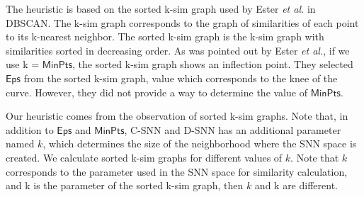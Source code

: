 \documentclass[smallextended]{svjour3}       %
\begin{document}
The heuristic is based on the sorted k-sim graph used by Ester \textit{et al.} \cite{E96} in DBSCAN. The k-sim graph corresponds to the graph of similarities of each point to its k-nearest neighbor. The sorted k-sim graph is the k-sim graph with similarities sorted in decreasing order. As was pointed out by Ester \textit{et al.}, if we use k = $\mathsf{MinPts}$, the sorted k-sim graph shows an inflection point. They selected $\mathsf{Eps}$ from the sorted k-sim graph, value which corresponds to the knee of the curve. 
However, they did not provide a way to determine the value of $\mathsf{MinPts}$. 

Our heuristic comes from the observation of sorted k-sim graphs. 
Note that, in addition to $\mathsf{Eps}$ and $\mathsf{MinPts}$, C-SNN and D-SNN has an additional parameter named $k$, which determines the size of the neighborhood where the SNN space is created. 
We calculate sorted k-sim graphs for different values of $k$. 
Note that $k$ corresponds to the parameter used in the SNN space for similarity calculation, and k is the parameter of the sorted k-sim graph, then $k$ and k are different. 
\end{document}
